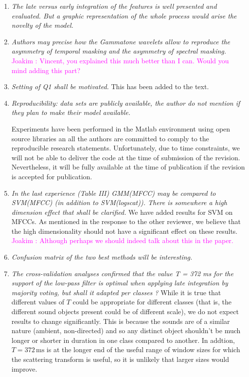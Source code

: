 \documentclass[10pt]{article}
\newcommand{\ja}[1]{\textcolor{magenta}{Joakim : #1}}
\begin{document}
\begin{enumerate}

\item \emph{The late versus early integration of the features is well presented and evaluated. But a graphic representation of the whole process would arise the novelty of the model.}

\item \emph{Authors may precise  how the Gammatone wavelets allow to reproduce the asymmetry of temporal masking and the asymmetry of spectral masking.}
\ja{Vincent, you explained this much better than I can. Would you mind adding this part?}

\item \emph{Setting of Q1 shall be motivated.}
This has been added to the text.

\item \emph{Reproducibility:  data sets are publicly available, the author do not mention if they plan to make their model available.}

Experiments have been performed in the Matlab environment using open source libraries an all the authors are committed to comply to the reproducible research statements. Unfortunately, due to time constraints, we will not be able to deliver the code at the time of submission of the revision. Nevertheless, it will be fully available at the time of publication if the revision is accepted for publication.

\item \emph{In the last experience (Table III) GMM(MFCC) may be compared to SVM(MFCC) (in addition to SVM(logscat)). There is somewhere a high dimension effect that shall be clarified.}
We have added results for SVM on MFCCs. As mentioned in the response to the other reviewer, we believe that the high dimensionality should not have a significant effect on these results. \ja{Although perhaps we should indeed talk about this in the paper.}

\item \emph{Confusion matrix of the two best methods will be interesting.}

\item \emph{The cross-validation analyses confirmed that the value T = 372 ms for the support of the low-pass filter is optimal when applying late integration by majority voting, but shall it adapted per classes  ?}
While it is true that different values of $T$ could be appropriate for different classes (that is, the different sound objects present could be of different scale), we do not expect results to change significantly. This is because the sounds are of a similar nature (ambient, non-directed) and so any distinct object shouldn't be much longer or shorter in duration in one class compared to another. In addtion, $T = 372\,\mathrm{ms}$ is at the longer end of the useful range of window sizes for which the scattering transform is useful, so it is unlikely that larger sizes would improve.


\end{enumerate}
\end{document}
